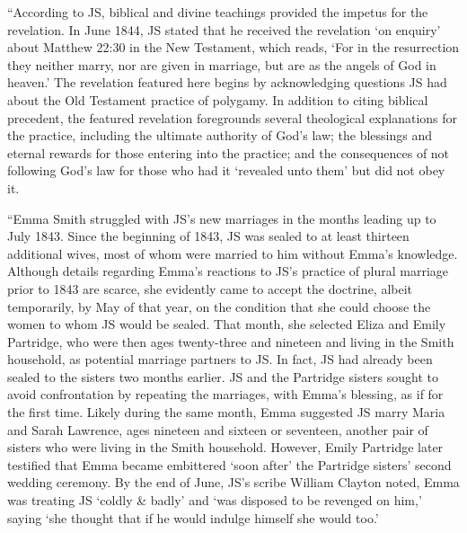 			``According to JS, biblical and divine teachings provided the impetus for the revelation. In June 1844, JS stated that he received the revelation `on enquiry' about Matthew 22:30 in the New Testament, which reads, `For in the resurrection they neither marry, nor are given in marriage, but are as the angels of God in heaven.' The revelation featured here begins by acknowledging questions JS had about the Old Testament practice of polygamy. In addition to citing biblical precedent, the featured revelation foregrounds several theological explanations for the practice, including the ultimate authority of God's law; the blessings and eternal rewards for those entering into the practice; and the consequences of not following God's law for those who had it `revealed unto them' but did not obey it.

			``Emma Smith struggled with JS's new marriages in the months leading up to July 1843. Since the beginning of 1843, JS was sealed to at least thirteen additional wives, most of whom were married to him without Emma's knowledge. Although details regarding Emma's reactions to JS's practice of plural marriage prior to 1843 are scarce, she evidently came to accept the doctrine, albeit temporarily, by May of that year, on the condition that she could choose the women to whom JS would be sealed. That month, she selected Eliza and Emily Partridge, who were then ages twenty-three and nineteen and living in the Smith household, as potential marriage partners to JS. In fact, JS had already been sealed to the sisters two months earlier. JS and the Partridge sisters sought to avoid confrontation by repeating the marriages, with Emma's blessing, as if for the first time. Likely during the same month, Emma suggested JS marry Maria and Sarah Lawrence, ages nineteen and sixteen or seventeen, another pair of sisters who were living in the Smith household. However, Emily Partridge later testified that Emma became embittered `soon after' the Partridge sisters' second wedding ceremony. By the end of June, JS's scribe William Clayton noted, Emma was treating JS `coldly \& badly' and `was disposed to be revenged on him,' saying `she thought that if he would indulge himself she would too.'

